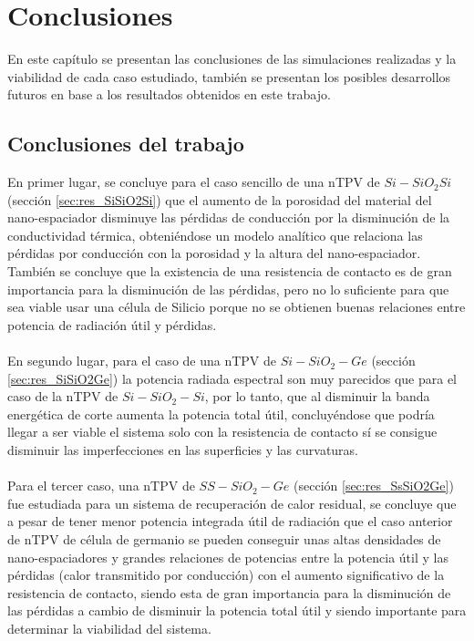 \chapter{Conclusiones}
En este capítulo se presentan las conclusiones de las simulaciones realizadas y la viabilidad de cada caso estudiado, también se presentan los posibles desarrollos futuros en base a los resultados obtenidos en este trabajo.

\section{Conclusiones del trabajo}
En primer lugar, se concluye para el caso sencillo de una nTPV de $Si-SiO_2Si$ (sección \ref{sec:res_SiSiO2Si}) que el aumento de la porosidad del material del nano-espaciador disminuye las pérdidas de conducción por la disminución de la conductividad térmica, obteniéndose un modelo analítico que relaciona las pérdidas por conducción con la porosidad y la altura del nano-espaciador. También se concluye que la existencia de una resistencia de contacto es de gran importancia para la disminución de las pérdidas, pero no lo suficiente para que sea viable usar una célula de Silicio porque no se obtienen buenas relaciones entre potencia de radiación útil y pérdidas.\\\\
En segundo lugar, para el caso de una nTPV de $Si-SiO_2-Ge$ (sección \ref{sec:res_SiSiO2Ge}) la potencia radiada espectral son muy parecidos que para el caso de la nTPV de $Si-SiO_2-Si$, por lo tanto, que al disminuir la banda energética de corte aumenta la potencia total útil, concluyéndose que podría llegar a ser viable el sistema solo con la resistencia de contacto sí se consigue disminuir las imperfecciones en las superficies y las curvaturas.\\\\
Para el tercer caso, una nTPV de $SS-SiO_2-Ge$ (sección \ref{sec:res_SsSiO2Ge}) fue estudiada para un sistema de recuperación de calor residual, se concluye que a pesar de tener menor potencia integrada útil de radiación que el caso anterior de nTPV de célula de germanio se pueden conseguir unas altas densidades de nano-espaciadores y grandes relaciones de potencias entre la potencia útil y las pérdidas (calor transmitido por conducción) con el aumento significativo de la resistencia de contacto, siendo esta de gran importancia para la disminución de las pérdidas a cambio de disminuir la potencia total útil y siendo importante para determinar la viabilidad del sistema.\\\\
